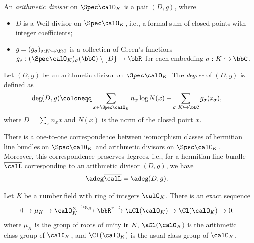     \begin{definition}\label{def:arithmetic_divisor}
        An \emph{arithmetic divisor} on \(\Spec \calO_K\) is a pair \((D, g)\), where
        \begin{itemize}
            \item \(D\) is a Weil divisor on \(\Spec \calO_K\), i.e., a formal sum of closed points with integer coefficients;
            \item \(g = (g_\sigma)_{\sigma: K \hookrightarrow \bbC}\) is a collection of Green's functions \(g_\sigma: (\Spec \calO_K)_\sigma(\bbC) \setminus \{D\} \to \bbR\) for each embedding \(\sigma: K \hookrightarrow \bbC\).
        \end{itemize}
    \end{definition}

    \begin{definition}\label{def:arithmetic_degree_of_arithmetic_divisors}
        Let \((D, g)\) be an arithmetic divisor on \(\Spec \calO_K\). 
        The \emph{degree} of \((D, g)\) is defined as
        \[
            \deg (D, g) \coloneqq \sum_{x \in \Spec \calO_K} n_x \log N(x) + \sum_{\sigma: K \hookrightarrow \bbC} g_\sigma(x_\sigma),
        \]
        where \(D = \sum_{x} n_x x\) and \(N(x)\) is the norm of the closed point \(x\).
    \end{definition}

    \begin{proposition}\label{prop:arithmetic_divisor_line_bundle_correspondence}
        There is a one-to-one correspondence between isomorphism classes of hermitian line bundles on \(\Spec \calO_K\) and arithmetic divisors on \(\Spec \calO_K\). 
        Moreover, this correspondence preserves degrees, i.e., for a hermitian line bundle \(\overline{\calL}\) corresponding to an arithmetic divisor \((D, g)\), we have
        \[
            \adeg \overline{\calL} = \adeg (D, g).
        \]
        
    \end{proposition}

    \begin{proposition}\label{prop:exact_sequence_of_several_class_groups}
        Let \(K\) be a number field with ring of integers \(\calO_K\).
        There is an exact sequence
        \[
            0 \to \mu_K \to \calO_K^\times \xrightarrow{\log_K} \bbR^{r} \xrightarrow{l} \aCl(\calO_K) \to \Cl(\calO_K) \to 0,
        \]
        where \(\mu_K\) is the group of roots of unity in \(K\), \(\aCl(\calO_K)\) is the arithmetic class group of \(\calO_K\), and \(\Cl(\calO_K)\) is the usual class group of \(\calO_K\).
    \end{proposition}


